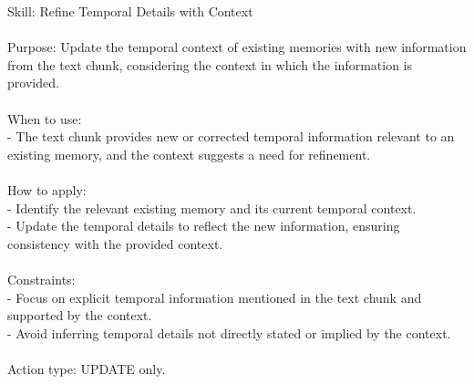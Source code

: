 \begin{center}
\begin{tcolorbox}[
  title={Evolved Skill on LoCoMo - REFINE\_TEMPORAL\_DETAILS\_WITH\_CONTEXT},
  colback=blue!2!white,
  colframe=blue!35!black,
  colbacktitle=blue!15!white,
  coltitle=black,
  coltext=black
]
{
Skill: Refine Temporal Details with Context \\\\
Purpose: Update the temporal context of existing memories with new information from the text chunk, considering the context in which the information is provided. \\\\
When to use: \\
- The text chunk provides new or corrected temporal information relevant to an existing memory, and the context suggests a need for refinement. \\\\
How to apply: \\
- Identify the relevant existing memory and its current temporal context. \\
- Update the temporal details to reflect the new information, ensuring consistency with the provided context. \\\\
Constraints: \\
- Focus on explicit temporal information mentioned in the text chunk and supported by the context. \\
- Avoid inferring temporal details not directly stated or implied by the context. \\\\
Action type: UPDATE only.
}
\label{appendix:case_refine_temporal_details_with_context}
\end{tcolorbox}
\end{center}

